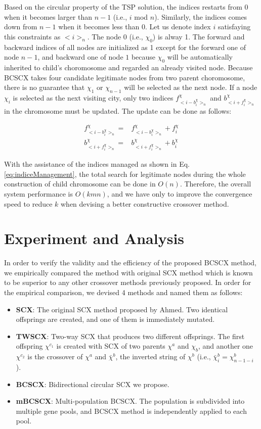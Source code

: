 Based on the circular property of the TSP solution, the indices restarts from 0 when it becomes larger than $n-1$ (i.e., $i$ mod $n$). Similarly, the indices comes down from $n-1$ when it becomes less than 0. Let us denote index $i$ satisfaying this constraints as  $<i>_n$. The node 0 (i.e., $\chi_0$) is alway 1. The forward and backward indices of all nodes are initialized as 1 except for the forward one of node $n-1$, and backward one of node $1$ because $\chi_0$ will be automatically inherited to child's choromosome and regarded an already visited node. Because BCSCX takes four candidate legitimate nodes from two parent choromosome, there is no guarantee that $\chi_1$ or $\chi_{n-1}$ will be selected as the next node. If a node $\chi_i$ is selected as the next visiting city, only two indices $f_{< i-b_i^\chi >_n}^\chi$ and $b_{< i+f_i^\chi >_n}^\chi$ in the chromosome must be updated. The update can be done as follows:

\begin{eqnarray}
\label{eq:indiceManagement}
f_{< i-b_i^\chi >_n}^\chi = & f_{< i-b_i^\chi >_n}^\chi + f_i^\chi  \\ \nonumber
b_{< i+f_i^\chi >_n}^\chi = & b_{< i+f_i^\chi >_n}^\chi  + b_i^\chi
\end{eqnarray}

With the assistance of the indices managed as shown in Eq. \ref{eq:indiceManagement}, the total search for legitimate nodes during the whole construction of child chromosome can be done in $O(n)$. Therefore, the overall system performance is $O(kmn)$, and we have only to improve the convergence speed to reduce $k$ when devising a better constructive crossover method.

\section{Experiment and Analysis}

In order to verify the validity and the efficiency of the proposed BCSCX method, we empirically compared the method with original SCX method
which is known to be superior to any other crossover methods previously proposed.
In order for the empirical comparison, we devised 4 methods and named them as follows:

\begin{itemize}
\item{{\bf SCX}: The original SCX method proposed by Ahmed\cite{ahmed2010genetic}. Two identical offsprings are created, and one of them is immediately mutated.}
\item{{\bf TWSCX}: Two-way SCX that produces two different offsprings. The first offspring $\chi^{c_1}$ is created with SCX of two parents $\chi^a$ and $\chi_b$, and another one $\chi^{c_2}$ is the crossover of $\chi^a$ and $\bar{\chi}^{b}$, the inverted string of $\chi^b$ (i.e., $\bar{\chi}^{b}_i = \chi^{b}_{n-1-i}$ ).}
\item{{\bf BCSCX}: Bidirectional circular SCX we propose.}
\item{{\bf mBCSCX}: Multi-population BCSCX. The population is subdivided into multiple gene pools, and BCSCX method is independently applied to each pool. }
\end{itemize}

